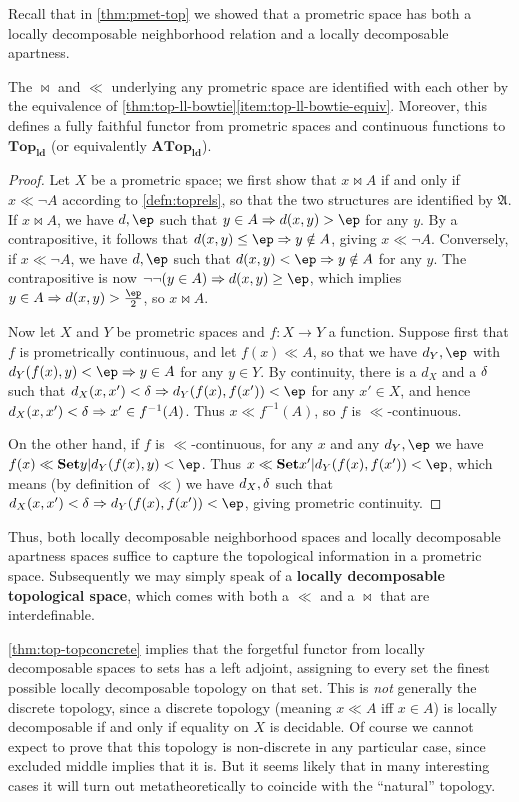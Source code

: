 \documentclass{article}
\def\cpl#1{\neg #1}
\let\implies\Rightarrow
\def\inv{^{-1}}
\def\hfep{\frac{\ep}{2}}
\def\anti{\mathfrak{A}}
\def\ldTop{\mathbf{Top}_{\mathbf{ld}}}
\def\ldATop{\mathbf{ATop}_{\mathbf{ld}}}
\begin{document}
Recall that in \cref{thm:pmet-top} we showed that a prometric space has both a locally decomposable neighborhood relation and a locally decomposable apartness.

\begin{thm}\label{thm:promet-top}
  The $\bowtie$ and $\ll$ underlying any prometric space are identified with each other by the equivalence of \cref{thm:top-ll-bowtie}\ref{item:top-ll-bowtie-equiv}.
  Moreover, this defines a fully faithful functor from prometric spaces and continuous functions to $\ldTop$ (or equivalently $\ldATop$).
\end{thm}
\begin{proof}
  Let $X$ be a prometric space; we first show that $x\bowtie A$ if and only if $x\ll \cpl{A}$ according to \cref{defn:toprels}, so that the two structures are identified by $\anti$.
  If $x\bowtie A$, we have $d,\ep$ such that $y\in A \implies d(x,y)>\ep$ for any $y$.
  By a contrapositive, it follows that $d(x,y)\le \ep \implies y\notin A$, giving $x\ll \cpl{A}$.
  Conversely, if $x\ll\cpl{A}$, we have $d,\ep$ such that $d(x,y)< \ep \implies y\notin A$ for any $y$.
  The contrapositive is now $\neg\neg(y\in A) \implies d(x,y)\ge \ep$, which implies $y\in A \implies d(x,y)> \hfep$, so $x\bowtie A$.

  Now let $X$ and $Y$ be prometric spaces and $f:X\to Y$ a function.
  Suppose first that $f$ is prometrically continuous, and let $f(x)\ll A$, so that we have $d_Y,\ep$ with $d_Y(f(x),y)< \ep \implies y\in A$ for any $y\in Y$.
  By continuity, there is a $d_X$ and a $\delta$ such that $d_X(x,x')<\de \implies d_Y(f(x),f(x'))<\ep$ for any $x'\in X$, and hence $d_X(x,x')<\de \implies x'\in f\inv(A)$.
  Thus $x\ll f\inv(A)$, so $f$ is $\ll$-continuous.

  On the other hand, if $f$ is $\ll$-continuous, for any $x$ and any $d_Y,\ep$ we have $f(x)\ll \setof{y|d_Y(f(x),y)<\ep}$.
  Thus $x\ll \setof{x'|d_Y(f(x),f(x'))<\ep}$, which means (by definition of $\ll$) we have $d_X,\delta$ such that $d_X(x,x')<\de \implies d_Y(f(x),f(x'))<\ep$, giving prometric continuity.
\end{proof}

Thus, both locally decomposable neighborhood spaces and locally decomposable apartness spaces suffice to capture the topological information in a prometric space.
Subsequently we may simply speak of a \textbf{locally decomposable topological space}, which comes with both a $\ll$ and a $\bowtie$ that are interdefinable.

\begin{rmk}
  \cref{thm:top-topconcrete} implies that the forgetful functor from locally decomposable spaces to sets has a left adjoint, assigning to every set the finest possible locally decomposable topology on that set.
  This is \emph{not} generally the discrete topology, since a discrete topology (meaning $x\ll A$ iff $x\in A$) is locally decomposable if and only if equality on $X$ is decidable.
  Of course we cannot expect to prove that this topology is non-discrete in any particular case, since excluded middle implies that it is.
  But it seems likely that in many interesting cases it will turn out metatheoretically to coincide with the ``natural'' topology.
\end{rmk}
\end{document}
